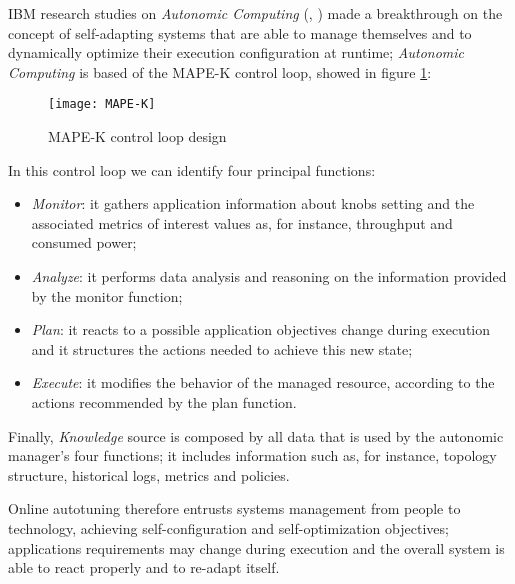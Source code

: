 IBM research studies on \textit{Autonomic Computing} (\cite{kephart2003vision}, \cite{computing2006architectural}) made a breakthrough on the concept of self-adapting systems that are able to manage themselves and to dynamically optimize their execution configuration at runtime; \textit{Autonomic Computing} is based of the MAPE-K control loop, showed in figure \ref{fig::mape-k}:

\begin{figure}[H]

    \centering
    \texttt{[image: MAPE-K]}
    \caption{MAPE-K control loop design}
    \label{fig::mape-k}

\end{figure}

In this control loop we can identify four principal functions:

\begin{itemize}

    \item \textit{Monitor}: it gathers application information about knobs setting and the associated metrics of interest values as, for instance, throughput and consumed power;
    
    \item \textit{Analyze}: it performs data analysis and reasoning on the information provided by the monitor function;
    
    \item \textit{Plan}: it reacts to a possible application objectives change during execution and it structures the actions needed to achieve this new state;
    
    \item \textit{Execute}: it modifies the behavior of the managed resource, according to the actions recommended by the plan function.

\end{itemize}

Finally, \textit{Knowledge} source is composed by all data that is used by the autonomic manager’s four functions; it includes information such as, for instance, topology structure, historical logs, metrics and policies.

Online autotuning therefore entrusts systems management from people to technology, achieving self-configuration and self-optimization objectives; applications requirements may change during execution and the overall system is able to react properly and to re-adapt itself.





